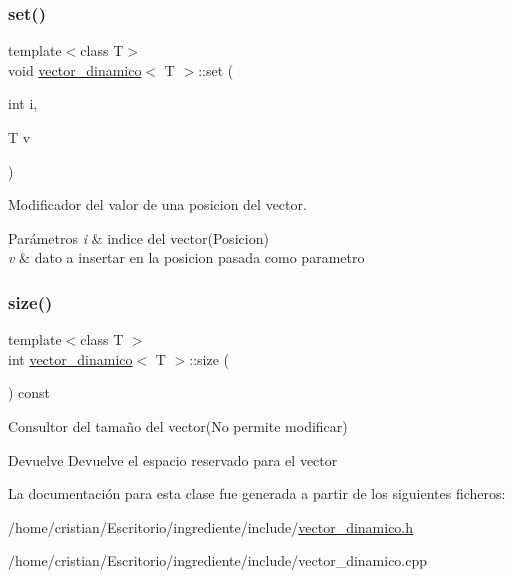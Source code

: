 \subsubsection{\texorpdfstring{set()}{set()}}
{\footnotesize\ttfamily template$<$class T$>$ \\
void \hyperlink{classvector__dinamico}{vector\+\_\+dinamico}$<$ T $>$\+::set (\begin{DoxyParamCaption}\item[{int}]{i,  }\item[{T}]{v }\end{DoxyParamCaption})}



Modificador del valor de una posicion del vector. 


\begin{DoxyParams}{Parámetros}
{\em i} & indice del vector(\+Posicion) \\
\hline
{\em v} & dato a insertar en la posicion pasada como parametro \\
\hline
\end{DoxyParams}
\mbox{\label{classvector__dinamico_a196f12479a340f66a26e59eadec6e4e6}} 
\subsubsection{\texorpdfstring{size()}{size()}}
{\footnotesize\ttfamily template$<$class T $>$ \\
int \hyperlink{classvector__dinamico}{vector\+\_\+dinamico}$<$ T $>$\+::size (\begin{DoxyParamCaption}{ }\end{DoxyParamCaption}) const}



Consultor del tamaño del vector(\+No permite modificar) 

\begin{DoxyReturn}{Devuelve}
Devuelve el espacio reservado para el vector 
\end{DoxyReturn}


La documentación para esta clase fue generada a partir de los siguientes ficheros\+:\begin{DoxyCompactItemize}
\item 
/home/cristian/\+Escritorio/ingrediente/include/\hyperlink{vector__dinamico_8h}{vector\+\_\+dinamico.\+h}\item 
/home/cristian/\+Escritorio/ingrediente/include/vector\+\_\+dinamico.\+cpp\end{DoxyCompactItemize}
